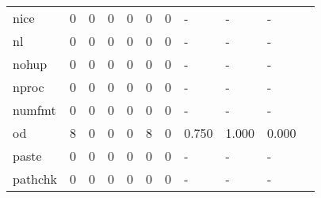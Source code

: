 \begin{longtable}{lp{1.10cm}p{1.10cm}p{1.10cm}p{1.10cm}p{1.10cm}p{1.10cm}p{1.10cm}p{1.10cm}p{1.10cm}p{1.10cm}}
nice      &                      0 &                                  0 &                                 0 &                                0 &                                 0 &                               0 &                              - &                                     - &                                   - \\
nl        &                      0 &                                  0 &                                 0 &                                0 &                                 0 &                               0 &                              - &                                     - &                                   - \\
nohup     &                      0 &                                  0 &                                 0 &                                0 &                                 0 &                               0 &                              - &                                     - &                                   - \\
nproc     &                      0 &                                  0 &                                 0 &                                0 &                                 0 &                               0 &                              - &                                     - &                                   - \\
numfmt    &                      0 &                                  0 &                                 0 &                                0 &                                 0 &                               0 &                              - &                                     - &                                   - \\
od        &                      8 &                                  0 &                                 0 &                                0 &                                 8 &                               0 &                          0.750 &                                 1.000 &                               0.000 \\
paste     &                      0 &                                  0 &                                 0 &                                0 &                                 0 &                               0 &                              - &                                     - &                                   - \\
pathchk   &                      0 &                                  0 &                                 0 &                                0 &                                 0 &                               0 &                              - &                                     - &                                   - \\

\end{longtable}

